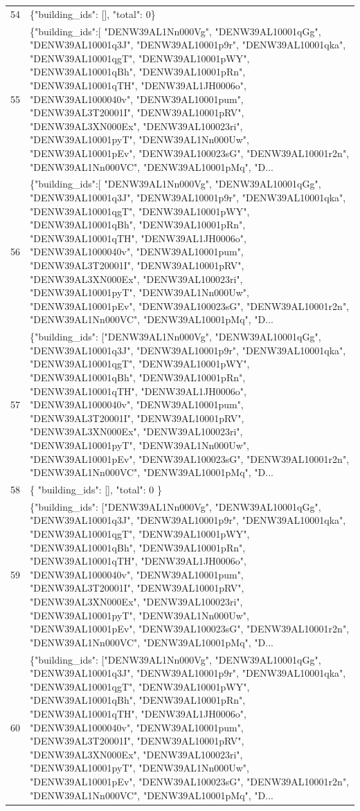 \documentclass[a4paper,11pt]{article}
\begin{document}
\begin{table}[ht]
\begin{tabular}{r p{12cm}}
54 & \{"building\_ids": [], "total": 0\} \\
55 & \{"building\_ids":[ "DENW39AL1Nn000Vg", "DENW39AL10001qGg", "DENW39AL10001q3J", "DENW39AL10001p9r", "DENW39AL10001qka", "DENW39AL10001qgT", "DENW39AL10001pWY", "DENW39AL10001qBh", "DENW39AL10001pRn", "DENW39AL10001qTH", "DENW39AL1JH0006o", "DENW39AL1000040v", "DENW39AL10001pum", "DENW39AL3T20001I", "DENW39AL10001pRV", "DENW39AL3XN000Ex", "DENW39AL100023ri", "DENW39AL10001pyT", "DENW39AL1Nn000Uw", "DENW39AL10001pEv", "DENW39AL100023sG", "DENW39AL10001r2n", "DENW39AL1Nn000VC", "DENW39AL10001pMq", "D... \\
56 & \{"building\_ids":[ "DENW39AL1Nn000Vg", "DENW39AL10001qGg", "DENW39AL10001q3J", "DENW39AL10001p9r", "DENW39AL10001qka", "DENW39AL10001qgT", "DENW39AL10001pWY", "DENW39AL10001qBh", "DENW39AL10001pRn", "DENW39AL10001qTH", "DENW39AL1JH0006o", "DENW39AL1000040v", "DENW39AL10001pum", "DENW39AL3T20001I", "DENW39AL10001pRV", "DENW39AL3XN000Ex", "DENW39AL100023ri", "DENW39AL10001pyT", "DENW39AL1Nn000Uw", "DENW39AL10001pEv", "DENW39AL100023sG", "DENW39AL10001r2n", "DENW39AL1Nn000VC", "DENW39AL10001pMq", "D... \\
57 & \{"building\_ids": ["DENW39AL1Nn000Vg", "DENW39AL10001qGg", "DENW39AL10001q3J", "DENW39AL10001p9r", "DENW39AL10001qka", "DENW39AL10001qgT", "DENW39AL10001pWY", "DENW39AL10001qBh", "DENW39AL10001pRn", "DENW39AL10001qTH", "DENW39AL1JH0006o", "DENW39AL1000040v", "DENW39AL10001pum", "DENW39AL3T20001I", "DENW39AL10001pRV", "DENW39AL3XN000Ex", "DENW39AL100023ri", "DENW39AL10001pyT", "DENW39AL1Nn000Uw", "DENW39AL10001pEv", "DENW39AL100023sG", "DENW39AL10001r2n", "DENW39AL1Nn000VC", "DENW39AL10001pMq", "D... \\
58 & \{
  "building\_ids": [],
  "total": 0
\} \\
59 & \{"building\_ids": ["DENW39AL1Nn000Vg", "DENW39AL10001qGg", "DENW39AL10001q3J", "DENW39AL10001p9r", "DENW39AL10001qka", "DENW39AL10001qgT", "DENW39AL10001pWY", "DENW39AL10001qBh", "DENW39AL10001pRn", "DENW39AL10001qTH", "DENW39AL1JH0006o", "DENW39AL1000040v", "DENW39AL10001pum", "DENW39AL3T20001I", "DENW39AL10001pRV", "DENW39AL3XN000Ex", "DENW39AL100023ri", "DENW39AL10001pyT", "DENW39AL1Nn000Uw", "DENW39AL10001pEv", "DENW39AL100023sG", "DENW39AL10001r2n", "DENW39AL1Nn000VC", "DENW39AL10001pMq", "D... \\
60 & \{"building\_ids": ["DENW39AL1Nn000Vg", "DENW39AL10001qGg", "DENW39AL10001q3J", "DENW39AL10001p9r", "DENW39AL10001qka", "DENW39AL10001qgT", "DENW39AL10001pWY", "DENW39AL10001qBh", "DENW39AL10001pRn", "DENW39AL10001qTH", "DENW39AL1JH0006o", "DENW39AL1000040v", "DENW39AL10001pum", "DENW39AL3T20001I", "DENW39AL10001pRV", "DENW39AL3XN000Ex", "DENW39AL100023ri", "DENW39AL10001pyT", "DENW39AL1Nn000Uw", "DENW39AL10001pEv", "DENW39AL100023sG", "DENW39AL10001r2n", "DENW39AL1Nn000VC", "DENW39AL10001pMq", "D... \\

\end{tabular}
\end{table}
\end{document}
